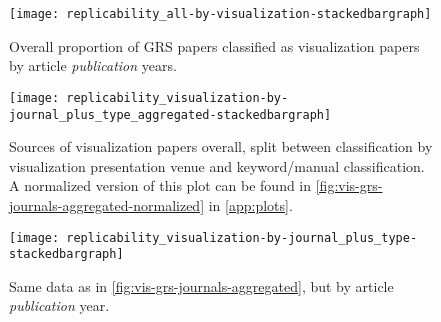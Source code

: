 \documentclass[conference]{vgtc}                     %
\begin{document}
\begin{figure}
	\centering
	\texttt{[image: replicability\_all-by-visualization-stackedbargraph]}
	\caption{Overall proportion of GRS papers classified as visualization papers by article \emph{publication} years.}
	\label{fig:grs-split-vis-novis}
\end{figure}

\begin{figure}
	\centering
	\texttt{[image: replicability\_visualization-by-journal\_plus\_type\_aggregated-stackedbargraph]}
	\caption{Sources of visualization papers overall, split between classification by visualization presentation venue and keyword/manual classification. A normalized version of this plot can be found in \autoref{fig:vis-grs-journals-aggregated-normalized} in \autoref{app:plots}.}
	\label{fig:vis-grs-journals-aggregated}
\end{figure}

\begin{figure}
	\centering
	\texttt{[image: replicability\_visualization-by-journal\_plus\_type-stackedbargraph]}
	\caption{Same data as in \autoref{fig:vis-grs-journals-aggregated}, but by article \emph{publication} year.}
	\label{fig:vis-grs-journals-by-year}
\end{figure}
\end{document}
